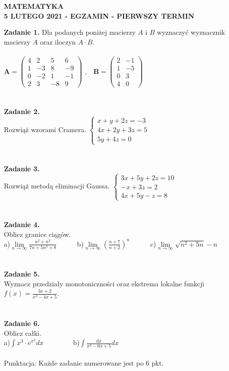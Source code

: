 \documentclass[12pt,a4paper]{report}
\begin{document}
\begin{center}

\textbf{MATEMATYKA \\5 LUTEGO 2021 - EGZAMIN - PIERWSZY TERMIN}

\end{center}\textbf{Zadanie 1.} Dla podanych poniżej macierzy $A$ i $B$ wyznaczyć wyznacznik macierzy $A$ oraz iloczyn $A\cdot B$. \\\\ $\mathbf{A} =\left( \begin{array}{cccc}4 & 2& 5 & 6\\1 & -3& 8 & -9\\0 & -2& 1 & -1\\2 & 3 & -8 & 9 \end{array} \right)$ ,\ \ $\mathbf{B} =\left( \begin{array}{cccc}2 & -1\\1 & -5\\0 & 3\\4 & 0  \end{array} \right)$\\\\\\\textbf{Zadanie 2.} \\Rozwiąż wzorami Cramera. $\left\{ \begin{array}{ll}x+y+2z=-3\\4x+2y+3z=5\\5y+4z=0\end{array} \right.$\\\\\\\textbf{Zadanie 3.} \\Rozwiąż metodą eliminacji Gaussa. $\left\{ \begin{array}{ll}3x+5y+2z=10\\-x+3z=2\\4x+5y-z=8\end{array} \right.$\\\\\\\textbf{Zadanie 4.} \\Oblicz granice ciągów.\\a)$\lim\limits_{n\to\infty}\frac{n^2+n^3}{7n+5n^3+8}$\ \ \ \ \ \  b)$\lim\limits_{n\to \infty}(\frac{n+7}{n+2})^n$\ \ \ \ \ \ c)$\lim\limits_{n\to\infty} \sqrt{n^2+5n}-n$\\\\\\\textbf{Zadanie 5.} \\Wyznacz przedziały monotoniczności oraz ekstrema lokalne funkcji $f(x)=\frac{3x+2}{x^2-4x+5}$.\\\\\\\textbf{Zadanie 6.} \\Oblicz całki. \\a)$\int x^3\cdot e^{x^2} dx$ \ \ \ \ \ \ \ \ b)$\int \frac{dx}{x^2-6x+5} dx$\\\\Punktacja: Każde zadanie numerowane jest po 6 pkt.
\end{document}
